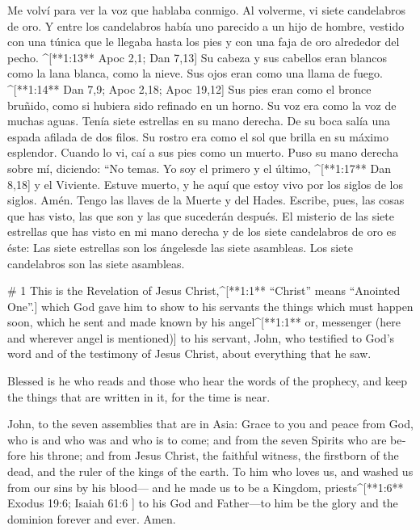 \begin{paracols}{2}
 Me volví para ver la voz que hablaba conmigo. Al volverme, vi siete candelabros de oro.  Y entre los candelabros había uno parecido a un hijo de hombre, vestido con una túnica que le llegaba hasta los pies y con una faja de oro alrededor del pecho. ^[**1:13** Apoc 2,1; Dan 7,13]  Su cabeza y sus cabellos eran blancos como la lana blanca, como la nieve. Sus ojos eran como una llama de fuego. ^[**1:14** Dan 7,9; Apoc 2,18; Apoc 19,12]  Sus pies eran como el bronce bruñido, como si hubiera sido refinado en un horno. Su voz era como la voz de muchas aguas.  Tenía siete estrellas en su mano derecha. De su boca salía una espada afilada de dos filos. Su rostro era como el sol que brilla en su máximo esplendor.  Cuando lo vi, caí a sus pies como un muerto. Puso su mano derecha sobre mí, diciendo: “No temas. Yo soy el primero y el último, ^[**1:17** Dan 8,18]  y el Viviente. Estuve muerto, y he aquí que estoy vivo por los siglos de los siglos. Amén. Tengo las llaves de la Muerte y del Hades.  Escribe, pues, las cosas que has visto, las que son y las que sucederán después.  El misterio de las siete estrellas que has visto en mi mano derecha y de los siete candelabros de oro es éste: Las siete estrellas son los ángelesde las siete asambleas. Los siete candelabros son las siete asambleas. 

\switchcolumn
\begin{english}

# 1
 This is the Revelation of Jesus Christ,^[**1:1** “Christ” means “Anointed One”.] which God gave him to show to his servants the things which must happen soon, which he sent and made known by his angel^[**1:1** or, messenger (here and wherever angel is mentioned)] to his servant, John,  who testified to God’s word and of the testimony of Jesus Christ, about everything that he saw. 

 Blessed is he who reads and those who hear the words of the prophecy, and keep the things that are written in it, for the time is near. 

 John, to the seven assemblies that are in Asia: Grace to you and peace from God, who is and who was and who is to come; and from the seven Spirits who are before his throne;  and from Jesus Christ, the faithful witness, the firstborn of the dead, and the ruler of the kings of the earth. To him who loves us, and washed us from our sins by his blood—  and he made us to be a Kingdom, priests^[**1:6** Exodus 19:6; Isaiah 61:6 ] to his God and Father—to him be the glory and the dominion forever and ever. Amen. 


\end{english}
\end{paracols}
